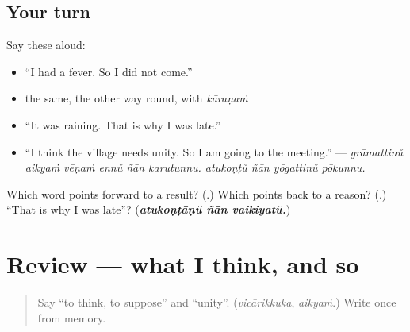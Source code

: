 \subsection*{Your turn}
Say these aloud:

\begin{itemize}
\raggedright
  \item \textquotedblleft{}I had a fever. So I did not come.\textquotedblright{}
  \item the same, the other way round, with \emph{kāraṇaṁ}
  \item \textquotedblleft{}It was raining. That is why I was late.\textquotedblright{}
  \item \textquotedblleft{}I think the village needs unity. So I am going to the meeting.\textquotedblright{} — \emph{grāmattinŭ aikyaṁ vēṇaṁ ennŭ ñān karutunnu. atukoṇṭŭ ñān yōgattinŭ pōkunnu.}
\end{itemize}

\begin{tcolorbox}[breakable,colback=teal!4,colframe=teal!35!black,title={Before you move on}]
Which word points forward to a result? (\textbf{}.) Which points back to a reason? (\textbf{}.) \textquotedblleft{}That is why I was late\textquotedblright{}? (\emph{\textbf{atukoṇṭāṇŭ ñān vaikiyatŭ.}})
\end{tcolorbox}
\section[(review)]{Review — what I think, and so}

\label{lesson:ML-R341-opinion-and-result}



\begin{quote}
Say \textquotedblleft{}to think, to suppose\textquotedblright{} and \textquotedblleft{}unity\textquotedblright{}. (\emph{vicārikkuka}, \emph{aikyaṁ}.) Write \textbf{} once from memory.
\end{quote}

